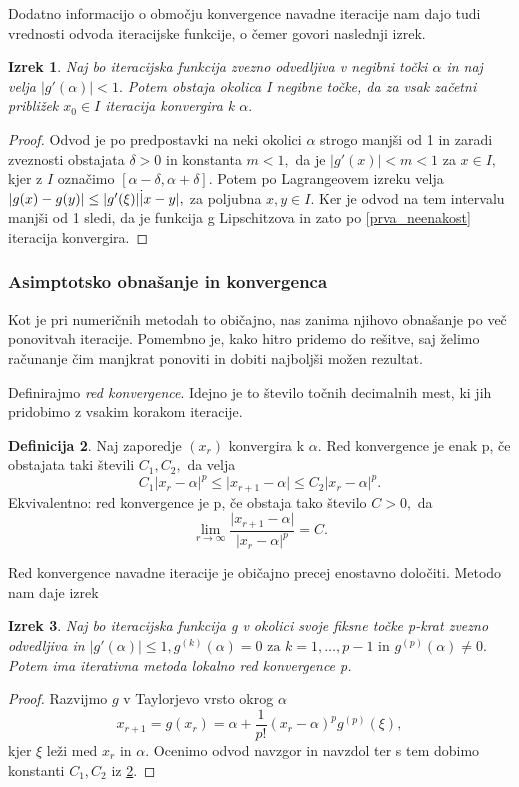 \documentclass[12pt,a4paper]{amsart}
\theoremstyle{definition} %
\newtheorem{definicija}{Definicija}[section]
\theoremstyle{plain} %
\newtheorem{izrek}[definicija]{Izrek}
\begin{document}
Dodatno informacijo o območju konvergence navadne iteracije nam dajo tudi vrednosti odvoda iteracijske funkcije, o čemer govori naslednji izrek.
\begin{izrek}
    Naj bo iteracijska funkcija zvezno odvedljiva v negibni točki $\alpha$ in naj velja $\lvert g'(\alpha) \rvert < 1.$ Potem obstaja okolica I negibne točke,
    da za vsak začetni približek $x_{0} \in I$ iteracija konvergira k $\alpha.$
\end{izrek}
\begin{proof}
    Odvod je po predpostavki na neki okolici $\alpha$ strogo manjši od 1 in zaradi zveznosti obstajata $\delta > 0$ in konstanta $m < 1,$ da je $\lvert g'(x) \rvert < m < 1$ za $x \in I,$
    kjer z $I$ označimo $[\alpha - \delta,\alpha + \delta ].$ Potem po Lagrangeovem izreku velja $\lvert g(x) - g(y) \rvert \leq \lvert g'(\xi) \rvert \dot \lvert x - y \rvert,$
    za poljubna $x,y \in I.$ Ker je odvod na tem intervalu manjši od 1 sledi, da je funkcija g Lipschitzova in zato po \eqref{prva_neenakost} iteracija konvergira.
\end{proof}

\subsubsection{Asimptotsko obnašanje in konvergenca}
Kot je pri numeričnih metodah to običajno, nas zanima njihovo obnašanje po več ponovitvah iteracije. Pomembno je, kako hitro pridemo do rešitve, saj želimo računanje čim manjkrat
ponoviti in dobiti najboljši možen rezultat.

Definirajmo \textit{red konvergence}. Idejno je to število točnih decimalnih mest, ki jih pridobimo z vsakim korakom iteracije. 
\begin{definicija}\label{red_konv}
    Naj zaporedje $(x_{r})$ konvergira k $\alpha.$ Red konvergence je enak p, če obstajata taki števili $C_{1}, C_{2},$ da velja
    \[
        C_{1}\lvert x_{r} - \alpha \rvert ^{p} \leq \lvert x_{r+1} - \alpha \rvert \leq C_{2} \lvert x_{r} - \alpha \rvert^{p}.
    \]
    Ekvivalentno: red konvergence je p, če obstaja tako število $C > 0,$ da
    \[
        \lim_{r\to\infty} \frac{\lvert x_{r+1} - \alpha\rvert}{\lvert x_{r} - \alpha\rvert^{p}} = C.
    \]
\end{definicija}

Red konvergence navadne iteracije je običajno precej enostavno določiti. Metodo nam daje izrek
\begin{izrek}
    Naj bo iteracijska funkcija g v okolici svoje fiksne točke p-krat zvezno odvedljiva in $\lvert g'(\alpha) \rvert \leq 1, g^{(k)}(\alpha) = 0\text{ za }k = 1,\ldots,p-1 \text{ in }
    g^{(p)}(\alpha) \neq 0.$ Potem ima iterativna metoda lokalno red konvergence p.
\end{izrek}
\begin{proof}
    Razvijmo $g$ v Taylorjevo vrsto okrog $\alpha$
    \[
        x_{r+1} = g(x_{r}) = \alpha + \frac{1}{p!}(x_{r} - \alpha)^{p}g^{(p)}(\xi),
    \]
    kjer $\xi$ leži med $x_{r}$ in $\alpha.$ Ocenimo odvod navzgor in navzdol ter s tem dobimo konstanti $C_{1},C_{2}$ iz \ref{red_konv}.
\end{proof}
\end{document}

